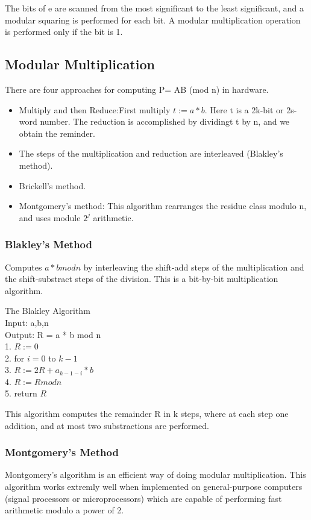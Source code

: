 The bits of e are scanned from the most significant to the least significant, and a modular squaring is performed for each bit. A modular multiplication operation is performed only if the bit is 1.

\subsection{Modular Multiplication}
There are four approaches for computing P= AB (mod n) in hardware.\cite{rsahardware}\\
\begin{itemize}
  \item Multiply and then Reduce:First multiply $t:=a*b$. Here t is a 2k-bit or 2s-word number. The reduction is accomplished by dividingt t by n, and we obtain the reminder.
  \item The steps of the multiplication and reduction are interleaved (Blakley's method).
  \item Brickell's method.
  \item Montgomery's method: This algorithm rearranges the residue class modulo n, and uses module $2^j$ arithmetic.
\end{itemize}

\subsubsection{Blakley's Method}
Computes $a*b mod n$ by interleaving the shift-add steps of the multiplication and the shift-substract steps of the division. This is a bit-by-bit multiplication algorithm.

\begin{algorithm}
The Blakley Algorithm\\
Input: a,b,n\\
Output: R = a * b mod n\\
1. $R:= 0$\\
2. for $i=0$ to $k-1$ \\
3. $R:=2R + a_{k-1-i}*b$\\
4. $R:= R mod n$\\
5. return $R$
\end{algorithm}

This algorithm computes the remainder R in k steps, where at each step one addition, and at most two substractions are performed.


\subsubsection{Montgomery's Method}
Montgomery's algorithm is an efficient way of doing modular multiplication. This algorithm works extremly well when implemented on general-purpose computers (signal processors or microprocessors) which are capable of performing fast arithmetic modulo a power of 2. 

